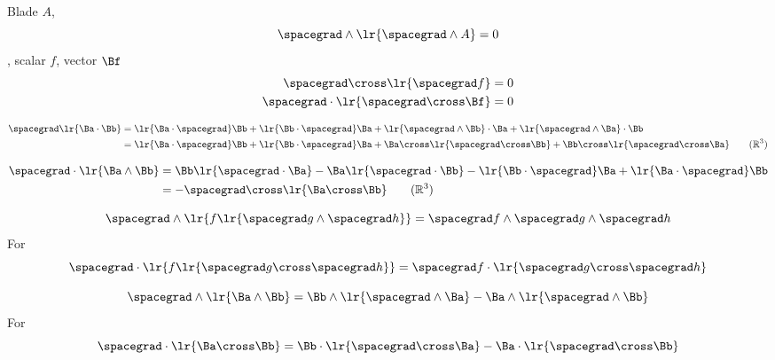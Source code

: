 Blade \( A \),
\begin{equation}\label{eqn:helpful:340}
\spacegrad \wedge \lr{ \spacegrad \wedge A } = 0
\end{equation}
, scalar \( f \), vector \( \Bf \)
\begin{equation}\label{eqn:helpful:360}
\begin{aligned}
\spacegrad \cross \lr{ \spacegrad f } &= 0 \\
\spacegrad \cdot \lr{ \spacegrad \cross \Bf } &= 0
\end{aligned}
\end{equation}

\begin{equation}\label{eqn:helpful:380}
\begin{aligned}
\spacegrad \lr{ \Ba \cdot \Bb } &= \lr{ \Ba \cdot \spacegrad } \Bb + \lr{ \Bb \cdot \spacegrad } \Ba + \lr{ \spacegrad \wedge \Bb } \cdot \Ba + \lr{ \spacegrad \wedge \Ba } \cdot \Bb \\
&= \lr{ \Ba \cdot \spacegrad } \Bb + \lr{ \Bb \cdot \spacegrad } \Ba + \Ba \cross \lr{ \spacegrad \cross \Bb } + \Bb \cross \lr{ \spacegrad \cross \Ba } \qquad(\mathbb{R}^3)
\end{aligned}
\end{equation}

\begin{equation}\label{eqn:helpful:400}
\begin{aligned}
\spacegrad \cdot \lr{ \Ba \wedge \Bb }
&= \Bb \lr{ \spacegrad \cdot \Ba } - \Ba \lr{ \spacegrad \cdot \Bb } - \lr{ \Bb \cdot \spacegrad } \Ba + \lr{ \Ba \cdot \spacegrad } \Bb \\
&= -\spacegrad \cross \lr{ \Ba \cross \Bb }\qquad(\mathbb{R}^3)
\end{aligned}
\end{equation}


\begin{equation}\label{eqn:helpful:420}
\spacegrad \wedge \lr{ f \lr{ \spacegrad g \wedge \spacegrad h } } = \spacegrad f \wedge \spacegrad g \wedge \spacegrad h
\end{equation}
For 
\begin{equation}\label{eqn:helpful:440}
\spacegrad \cdot \lr{ f \lr{ \spacegrad g \cross \spacegrad h } } = \spacegrad f \cdot \lr{ \spacegrad g \cross \spacegrad h }
\end{equation}

\begin{equation}\label{eqn:helpful:460}
\spacegrad \wedge \lr{ \Ba \wedge \Bb } = \Bb \wedge \lr{ \spacegrad \wedge \Ba } - \Ba \wedge \lr{ \spacegrad \wedge \Bb }
\end{equation}
For 
\begin{equation}\label{eqn:helpful:480}
\spacegrad \cdot \lr{ \Ba \cross \Bb } = \Bb \cdot \lr{ \spacegrad \cross \Ba } - \Ba \cdot \lr{ \spacegrad \cross \Bb }
\end{equation}
